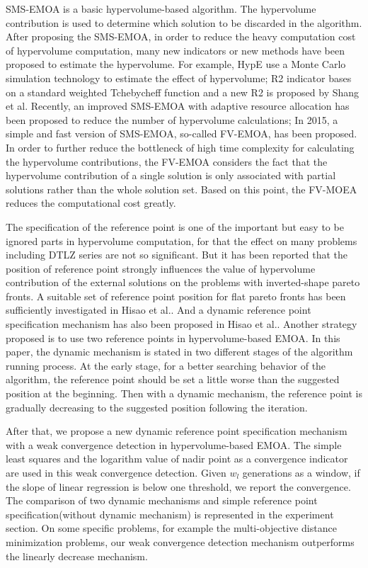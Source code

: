 \documentclass[conference]{IEEEtran}
\begin{document}
SMS-EMOA\cite{smsemoa} is a basic hypervolume-based algorithm. 
The hypervolume contribution is used to determine which solution to be discarded in the algorithm. 
After proposing the SMS-EMOA, in order to reduce the heavy computation cost of hypervolume computation, 
many new indicators or new methods have been proposed to estimate the hypervolume. 
For example, HypE use a Monte Carlo simulation technology to estimate the effect of hypervolume\cite{HypE}; 
R2 indicator bases on a standard weighted Tchebycheff function\cite{R2} and a new R2 is proposed by Shang et al\cite{newR2}.
Recently, an improved SMS-EMOA with adaptive resource allocation has been proposed to reduce the number of hypervolume calculations\cite{ismsemoa}; 
In 2015, a simple and fast version of SMS-EMOA\cite{smsemoa}, so-called FV-EMOA, has been proposed\cite{FVEMOA}.
In order to further reduce the bottleneck of high time complexity for calculating the hypervolume contributions, 
the FV-EMOA considers the fact that the hypervolume contribution of a single solution 
is only associated with partial solutions rather than the whole solution set\cite{FVEMOA}. 
Based on this point, the FV-MOEA reduces the computational cost greatly. 

The specification of the reference point is one of the important but easy to be ignored parts in hypervolume computation, 
for that the effect on many problems including DTLZ series\cite{DTLZ} are not so significant. 
But it has been reported that the position of reference point strongly influences the value of
hypervolume contribution of the external solutions on the problems with inverted-shape pareto fronts\cite{hisao:RPhowtoSpecify, hisao:RPspecify, hisao:RPexplanation}. 
A suitable set of reference point position for flat pareto fronts has been sufficiently investigated in Hisao et al.\cite{hisao:RPspecify}.
And a dynamic reference point specification mechanism has also been proposed in Hisao et al.\cite{hisao:dynamic}.
Another strategy proposed is to use two reference points in hypervolume-based EMOA\cite{hisao:twoRP}. 
In this paper, the dynamic mechanism is stated in two different stages of the algorithm running process. 
At the early stage, for a better searching behavior of the algorithm, 
the reference point should be set a little worse than the suggested position at the beginning.
Then with a dynamic mechanism, the reference point is gradually decreasing to the suggested position following the iteration. 

After that, we propose a new dynamic reference point specification mechanism with a weak convergence detection in hypervolume-based EMOA. 
The simple least squares and the logarithm value of nadir point as a convergence indicator are used in this weak convergence detection. 
Given $w_l$ generations as a window, if the slope of linear regression is below one threshold, we report the convergence.
The comparison of two dynamic mechanisms and simple reference point specification(without dynamic mechanism) is 
represented in the experiment section. On some specific problems, for example the multi-objective distance minimization problems\cite{dmp},
our weak convergence detection mechanism outperforms the linearly decrease mechanism. 
\end{document}
